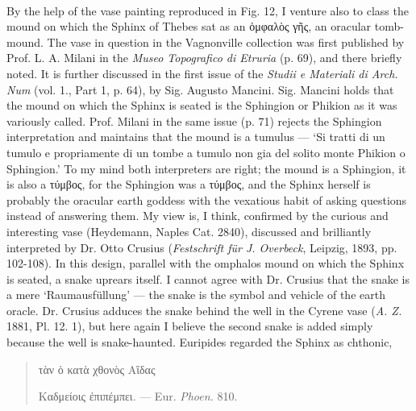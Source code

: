 \documentclass[a4paper, 11pt, oneside, polutonikogreek, english]{article}
\begin{document}
\paragraph{}
By the help of the vase painting reproduced in Fig. 12, I venture also to class the mound on which the Sphinx of Thebes sat as an ὀμφαλὸς γῆς, an oracular tomb-mound. The vase in question in the Vagnonville collection was first published by Prof. L. A. Milani in the \emph{Museo Topografico di Etruria} (p. 69), and there briefly noted. It is further discussed in the first issue of the \emph{Studii e Materiali di Arch. Num} (vol. 1., Part 1, p. 64), by Sig. Augusto Mancini. Sig. Mancini holds that the mound on which the Sphinx is seated is the Sphingion or Phikion as it was variously called. Prof. Milani in the same issue (p. 71) rejects the Sphingion interpretation and maintains that the mound is a tumulus --- `Si tratti di un tumulo e propriamente di un tombe a tumulo non gia del solito monte Phikion o Sphingion.' To my mind both interpreters are right; the mound is a Sphingion, it is also a τύμβος, for the Sphingion was a τύμβος, and the Sphinx herself is probably the oracular earth goddess with the vexatious habit of asking questions instead of answering them. My view is, I think, confirmed by the curious and interesting vase (Heydemann, Naples Cat. 2840), discussed and brilliantly interpreted by Dr. Otto Crusius (\emph{Festschrift für J. Overbeck}, Leipzig, 1893, pp. 102-108). In this design, parallel with the omphalos mound on which the Sphinx is seated, a snake uprears itself. I cannot agree with Dr. Crusius that the snake is a mere `Raumausfüllung' --- the snake is the symbol and vehicle of the earth oracle. Dr. Crusius adduces the snake behind the well in the Cyrene vase (\emph{A. Z.} 1881, Pl. 12. 1), but here again I believe the second snake is added simply because the well is snake-haunted. Euripides regarded the Sphinx as chthonic,
\begin{quotation}
\hspace*{15mm}τὰν ὁ κατὰ χθονὸς Αἵδας

Καδμείοις ἐπιπέμπει. --- Eur. \emph{Phoen.} 810.
\end{quotation}
\end{document}

